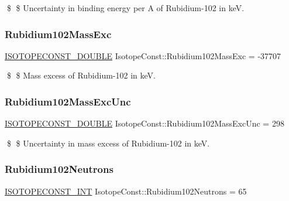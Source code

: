 \$ \$ Uncertainty in binding energy per A of Rubidium-\/102 in keV. \mbox{\label{group___isotope_const-_rubidium-_rb102_ga0b29365399c72c5c0128f61fe129de4a}} 
\subsubsection{\texorpdfstring{Rubidium102\+Mass\+Exc}{Rubidium102MassExc}}
{\footnotesize\ttfamily \mbox{\hyperlink{group___isotope_const-_macros_ga8f45a7272ce02c0b4c65c44636ed719a}{I\+S\+O\+T\+O\+P\+E\+C\+O\+N\+S\+T\+\_\+\+D\+O\+U\+B\+LE}} Isotope\+Const\+::\+Rubidium102\+Mass\+Exc = -\/37707}

\$ \$ Mass excess of Rubidium-\/102 in keV. \mbox{\label{group___isotope_const-_rubidium-_rb102_ga33f974397e5ec1f5e25bcd3edda32e28}} 
\subsubsection{\texorpdfstring{Rubidium102\+Mass\+Exc\+Unc}{Rubidium102MassExcUnc}}
{\footnotesize\ttfamily \mbox{\hyperlink{group___isotope_const-_macros_ga8f45a7272ce02c0b4c65c44636ed719a}{I\+S\+O\+T\+O\+P\+E\+C\+O\+N\+S\+T\+\_\+\+D\+O\+U\+B\+LE}} Isotope\+Const\+::\+Rubidium102\+Mass\+Exc\+Unc = 298}

\$ \$ Uncertainty in mass excess of Rubidium-\/102 in keV. \mbox{\label{group___isotope_const-_rubidium-_rb102_gad1f9aa174903c88ef3a44aab9ed0537b}} 
\subsubsection{\texorpdfstring{Rubidium102\+Neutrons}{Rubidium102Neutrons}}
{\footnotesize\ttfamily \mbox{\hyperlink{group___isotope_const-_macros_ga5f18360b3e99483a35c32d789e62621c}{I\+S\+O\+T\+O\+P\+E\+C\+O\+N\+S\+T\+\_\+\+I\+NT}} Isotope\+Const\+::\+Rubidium102\+Neutrons = 65}

